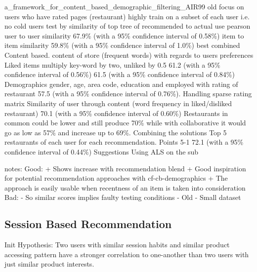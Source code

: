 a_framework_for_content_based_demographic_filtering_AIR99 old
focus on users who have rated pages (restaurant) highly
train on a subset of each user i.e. no cold users
    test by similarity of top tree of recommended to actual
use pearson
    user to user similarity 67.9\% (with a 95\% confidence interval of 0.58\%)
    item to item similarity 59.8\% (with a 95\% confidence interval of 1.0\%)
    best combined
Content based.
    content of store (frequent words) with regards to users preferences
        Liked items multiply key-word by two, unliked by 0.5
    61.2 (with a 95\% confidence interval of 0.56\%)
    61.5 (with a 95\% confidence interval of 0.84\%)
Demographics
    gender, age, area code, education and employed with rating of restaurant
    57.5 (with a 95\% confidence interval of 0.76\%).
Handling sparse rating matrix
    Similarity of user through content (word frequency in liked/disliked restaurant)
    70.1 (with a 95\% confidence interval of 0.60\%)
    Restaurants in common could be lower and still produce 70\% while with collaborative it would go as low as 57\% and increase up to 69\%.
Combining the solutions
    Top 5 restaurants of each user for each recommendation. Points 5-1
    72.1 (with a 95\% confidence interval of 0.44\%)
Suggestions
    Using ALS on the sub

notes:
Good:
    + Shows increase with recommendation blend
    + Good inspiration for potential recommendation approaches with cf-cb-demographics
    + The approach is easily usable when recentness of an item is taken into consideration
Bad:
    - So similar scores implies faulty testing conditions
    - Old
    - Small dataset




\subsection{Session Based Recommendation}
Init Hypothesis:
Two users with similar session habits and similar product accessing pattern
have a stronger correlation to one-another than two users with just similar
product interests.


